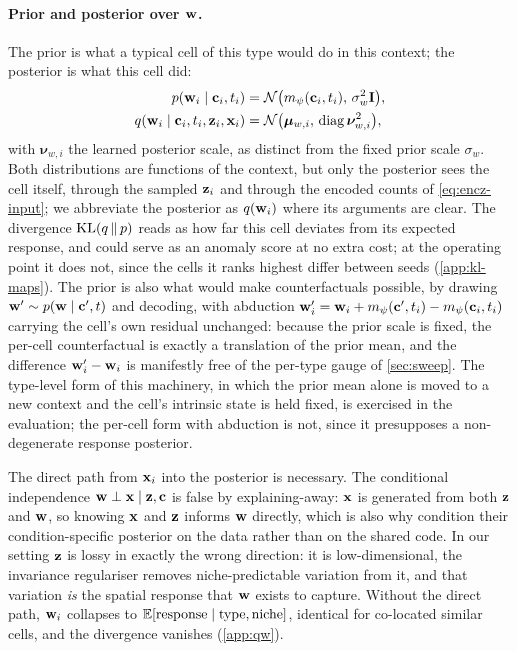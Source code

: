 \paragraph{Prior and posterior over $\mathbf{w}$.}
 The prior is what a typical cell of this type would do in this context; the posterior is what this cell did:
\begin{align}
  p(\mathbf{w}_i \mid \mathbf{c}_i, t_i) &= \mathcal{N}\big(m_{\psi}(\mathbf{c}_i, t_i),\, \sigma_w^2 \mathbf{I}\big), \label{eq:prior-w}\\
  q(\mathbf{w}_i \mid \mathbf{c}_i, t_i, \mathbf{z}_i, \mathbf{x}_i) &= \mathcal{N}\big(\boldsymbol{\mu}_{w,i},\, \operatorname{diag} \boldsymbol{\nu}_{w,i}^2\big), \label{eq:post-w}
\end{align}
with $\boldsymbol{\nu}_{w,i}$ the learned posterior scale, as distinct from the fixed prior scale $\sigma_w$. Both distributions are functions of the context, but only the posterior sees the cell itself, through the sampled $\mathbf{z}_i$ and through the encoded counts of \cref{eq:encz-input}; we abbreviate the posterior as $q(\mathbf{w}_i)$ where its arguments are clear. The divergence $\operatorname{KL}(q \,\|\, p)$ reads as how far this cell deviates from its expected response, and could serve as an anomaly score at no extra cost; at the operating point it does not, since the cells it ranks highest differ between seeds (\cref{app:kl-maps}). The prior is also what would make counterfactuals possible, by drawing $\mathbf{w}' \sim p(\mathbf{w} \mid \mathbf{c}', t)$ and decoding, with abduction $\mathbf{w}'_i = \mathbf{w}_i + m_{\psi}(\mathbf{c}', t_i) - m_{\psi}(\mathbf{c}_i, t_i)$ carrying the cell's own residual unchanged: because the prior scale is fixed, the per-cell counterfactual is exactly a translation of the prior mean, and the difference $\mathbf{w}'_i - \mathbf{w}_i$ is manifestly free of the per-type gauge of \cref{sec:sweep}. The type-level form of this machinery, in which the prior mean alone is moved to a new context and the cell's intrinsic state is held fixed, is exercised in the evaluation; the per-cell form with abduction is not, since it presupposes a non-degenerate response posterior.

The direct path from $\mathbf{x}_i$ into the posterior is necessary. The conditional independence $\mathbf{w} \perp \mathbf{x} \mid \mathbf{z}, \mathbf{c}$ is false by explaining-away: $\mathbf{x}$ is generated from both $\mathbf{z}$ and $\mathbf{w}$, so knowing $\mathbf{x}$ and $\mathbf{z}$ informs $\mathbf{w}$ directly, which is also why \citet{slavutsky2025} condition their condition-specific posterior on the data rather than on the shared code. In our setting $\mathbf{z}$ is lossy in exactly the wrong direction: it is low-dimensional, the invariance regulariser removes niche-predictable variation from it, and that variation \emph{is} the spatial response that $\mathbf{w}$ exists to capture. Without the direct path, $\mathbf{w}_i$ collapses to $\operatorname{\mathbb{E}}[\text{response} \mid \text{type}, \text{niche}]$, identical for co-located similar cells, and the divergence vanishes (\cref{app:qw}).

